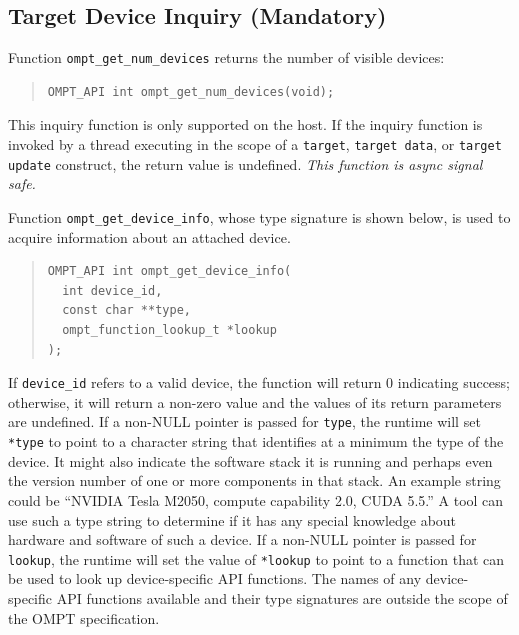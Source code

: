 \documentclass{article}
\begin{document}
\subsection{Target Device Inquiry (Mandatory)}
\label{sec:target-region}
Function \verb|ompt_get_num_devices| returns the number of visible devices:
\begin{quote}
\begin{verbatim}
OMPT_API int ompt_get_num_devices(void);
\end{verbatim}
\end{quote}
This inquiry function is only supported on the host. If the inquiry function is invoked by a thread executing in the scope of a {\tt target}, {\tt target data}, or {\tt target update} construct, the return value is undefined. {\it This function is async signal safe.}

Function \verb|ompt_get_device_info|, whose type signature is shown below, is used to acquire information about an attached device. 
\begin{quote}
\begin{verbatim}
OMPT_API int ompt_get_device_info(
  int device_id, 
  const char **type, 
  ompt_function_lookup_t *lookup
);
\end{verbatim}
\end{quote}
If \verb|device_id| refers to a valid device, the function will return 0 indicating success; otherwise, it will return a non-zero value and the values of its return parameters are undefined. If a non-NULL pointer is passed for \verb|type|, the runtime will set \verb|*type| to point to a character string that identifies at a minimum the  type of the device. It might also indicate the software stack it is running and perhaps even the version number of one or more components in that stack. An example string could be ``NVIDIA Tesla M2050, compute capability 2.0, CUDA 5.5.'' A tool can use such a type string to determine if it has any special knowledge about hardware and software of such a device. If a non-NULL pointer is passed for \verb|lookup|, the runtime will set the value of \verb|*lookup| to point to a function that can be used to look up device-specific API functions.  The names of any device-specific API functions available and their type signatures are outside the scope of the OMPT specification. 

\end{document}
